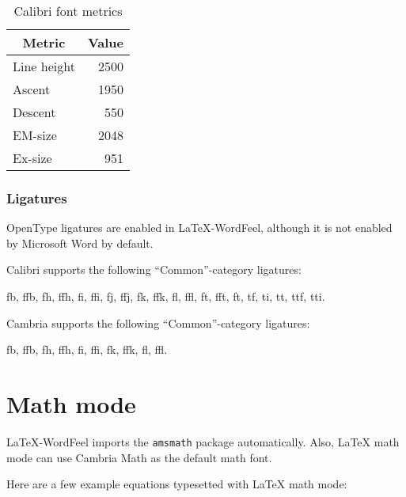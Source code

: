 \documentclass[letterpaper]{wordfeel}
\begin{document}
\begin{table}[htb]
    \centering
    \caption{Calibri font metrics}
    \label{tab:font-metrics}
    \begin{tabular}{lr}
        \toprule
        \multicolumn{1}{c}{Metric} & \multicolumn{1}{c}{Value}\\
        \midrule
        Line height & 2500 \\
        Ascent & 1950 \\
        Descent & 550 \\
        EM-size & 2048 \\
        Ex-size & 951 \\
        \bottomrule
    \end{tabular}
\end{table}

\FloatBarrier

\subsubsection{Ligatures}

OpenType ligatures are enabled in \LaTeX-WordFeel, although it is not enabled by Microsoft Word by default.

Calibri supports the following ``Common''-category ligatures:

{\LARGE fb, ffb, fh, ffh, fi, ffi, fj, ffj, fk, ffk, fl, ffl, ft, fft, ft, tf, ti, tt, ttf, tti.}

\textrm{Cambria} supports the following ``Common''-category ligatures:

{\LARGE\rmfamily fb, ffb, fh, ffh, fi, ffi, fk, ffk, fl, ffl.}

\section{Math mode}

\LaTeX-WordFeel imports the \texttt{amsmath} package automatically. Also, \LaTeX{} math mode can use \textrm{Cambria Math} as the default math font.

Here are a few example equations typesetted with \LaTeX{} math mode:
\end{document}
